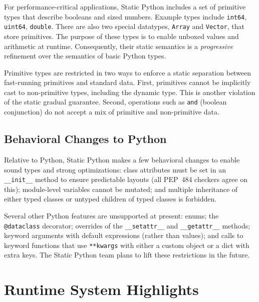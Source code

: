 \documentclass[english,cleveref,submission]{programming}
\newcommand{\SP}{Static Python}
\newcommand{\PEP}{PEP~484}
\newcommand{\code}[1]{\texttt{#1}}
\begin{document}
For performance-critical applications, \SP{} includes a set of primitive types
that describe booleans and sized numbers.
Example types include \code{int64}, \code{uint64}, \code{double}.
There are also two special datatypes, \code{Array} and \code{Vector}, that store primitives.
The purpose of these types is to enable unboxed values and arithmetic at
runtime.
Consequently, their static semantics is a \emph{progressive}~\cite{pqk-onward-2012}
refinement over the semantics of basic Python types.

Primitive types are restricted in two ways to enforce a static separation
between fast-running primitives and standard data.
First, primitives cannot be implicitly cast to non-primitive types,
including the dynamic type.
This is another violation of the static gradual guarantee.
Second, operations such as \code{and} (boolean conjunction) do not accept a mix
of primitive and non-primitive data.





\subsection{Behavioral Changes to Python}
\label{s:not-python}

Relative to Python, \SP{} makes a few behavioral changes to enable
sound types and strong optimizations:
class attributes must be set in an \code{\_\_init\_\_} method to
ensure predictable layouts (all \PEP{} checkers agree on this);
module-level variables cannot be mutated; and
multiple inheritance of either typed classes or untyped children
of typed classes is forbidden.

Several other Python features are unsupported at present:
enums; the \code{@dataclass} decorator;
overrides of the \code{\_\_setattr\_\_} and \code{\_\_getattr\_\_} methods;
keyword arguments with default expressions (rather than values); and
calls to keyword functions that use \code{**kwargs} with either
a custom object or a dict with extra keys.
The \SP{} team plans to lift these restrictions in the future.


\section{Runtime System Highlights}
\label{s:runtime}
\end{document}
